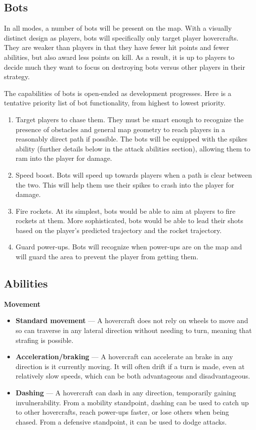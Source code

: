 \documentclass{article}
\theoremstyle{definition}
\begin{document}
\subsection{Bots}

In all modes, a number of bots will be present on the map. With a visually
distinct design as players, bots will specifically only target player
hovercrafts. They are weaker than players in that they have fewer hit points
and fewer abilities, but also award less points on kill. As a result, it is up
to players to decide much they want to focus on destroying bots versus other
players in their strategy.

The capabilities of bots is open-ended as development progresses. Here is
a tentative priority list of bot functionality, from highest to lowest
priority.
\begin{enumerate}
  \item Target players to chase them. They must be smart enough to recognize
    the presence of obstacles and general map geometry to reach players in
    a reasonably direct path if possible. The bots will be equipped with the
    spikes ability (further details below in the attack abilities section),
    allowing them to ram into the player for damage.
  \item Speed boost. Bots will speed up towards players when a path is clear
    between the two. This will help them use their spikes to crash into the
    player for damage.
  \item Fire rockets. At its simplest, bots would be able to aim at players to
    fire rockets at them. More sophisticated, bots would be able to lead their
    shots based on the player's predicted trajectory and the rocket trajectory.
  \item Guard power-ups. Bots will recognize when power-ups are on the map and
    will guard the area to prevent the player from getting them.
\end{enumerate}

\subsection{Abilities}

\textbf{Movement}

\begin{itemize}
  \item \textbf{Standard movement} --- A hovercraft does not rely on wheels to
    move and so can traverse in any lateral direction without needing to turn,
    meaning that strafing is possible.
  \item \textbf{Acceleration/braking} --- A hovercraft can accelerate an brake
    in any direction is it currently moving. It will often drift if a turn is
    made, even at relatively slow speeds, which can be both advantageous and
    disadvantageous.
  \item \textbf{Dashing} --- A hovercraft can dash in any direction,
    temporarily gaining invulnerability. From a mobility standpoint, dashing
    can be used to catch up to other hovercrafts, reach power-ups faster, or
    lose others when being chased. From a defensive standpoint, it can be used
    to dodge attacks.
\end{itemize}
\end{document}
